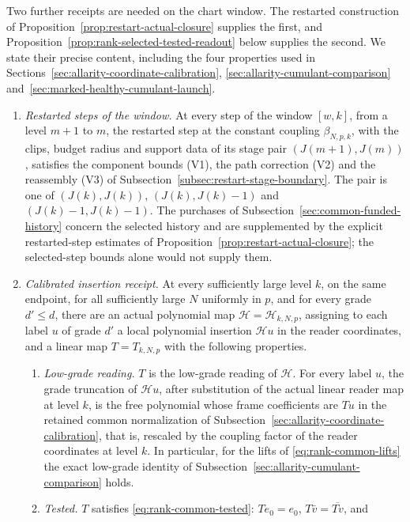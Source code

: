 Two further receipts are needed on the chart window. The restarted
construction of Proposition~\ref{prop:restart-actual-closure} supplies
the first, and Proposition~\ref{prop:rank-selected-tested-readout} below
supplies the second. We state their precise content, including the four
properties used in Sections~\ref{sec:allarity-coordinate-calibration},
\ref{sec:allarity-cumulant-comparison}
and~\ref{sec:marked-healthy-cumulant-launch}.
\begin{enumerate}
\item[(V)] \emph{Restarted steps of the window.} At every step of the
 window $[w,k]$, from a level $m+1$ to $m$, the restarted step at the
 constant coupling $\beta_{N,p,k}$, with the clips, budget radius and
 support data of its stage pair $(J(m+1),J(m))$, satisfies the component
 bounds (V1), the path correction (V2) and the reassembly (V3) of
 Subsection~\ref{subsec:restart-stage-boundary}. The pair is one of
 $(J(k),J(k))$, $(J(k),J(k)-1)$ and $(J(k)-1,J(k)-1)$. The purchases of
 Subsection~\ref{sec:common-funded-history} concern the selected history and
 are supplemented by the explicit restarted-step estimates of
 Proposition~\ref{prop:restart-actual-closure}; the selected-step bounds
 alone would not supply them.
\item[(T)] \emph{Calibrated insertion receipt.} At every sufficiently
 large level $k$, on the same endpoint, for all sufficiently large $N$
 uniformly in $p$, and for every grade $d'\le d$, there are an actual
 polynomial map $\mathcal H=\mathcal H_{k,N,p}$, assigning to each label
 $u$ of grade $d'$ a local polynomial insertion $\mathcal Hu$ in the reader
 coordinates, and a linear map $T=T_{k,N,p}$ with the following
 properties.
 \begin{enumerate}
 \item[(T1)] \emph{Low-grade reading.} $T$ is the low-grade reading of
  $\mathcal H$. For every label $u$, the grade truncation of $\mathcal Hu$,
  after substitution of the actual linear reader map at level $k$, is the
  free polynomial whose frame coefficients are $Tu$ in the retained common
  normalization of Subsection~\ref{sec:allarity-coordinate-calibration},
  that is, rescaled by the coupling factor of the reader coordinates at
  level $k$. In particular, for the lifts
  of \eqref{eq:rank-common-lifts} the exact low-grade identity of
  Subsection~\ref{sec:allarity-cumulant-comparison} holds.
 \item[(T2)] \emph{Tested.} $T$ satisfies \eqref{eq:rank-common-tested}:
  $Te_0=e_0$, $T\bar v=\overline{Tv}$, and

\end{enumerate}
\end{enumerate}
